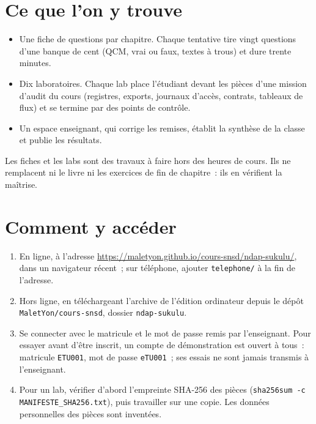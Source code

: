 \section*{Ce que l'on y trouve}

\begin{itemize}
    \item Une fiche de questions par chapitre. Chaque tentative tire vingt
          questions d'une banque de cent (QCM, vrai ou faux, textes à
          trous) et dure trente minutes.
    \item Dix laboratoires. Chaque lab place l'étudiant devant les pièces
          d'une mission d'audit du cours (registres, exports, journaux
          d'accès, contrats, tableaux de flux) et se termine par des points
          de contrôle.
    \item Un espace enseignant, qui corrige les remises, établit la
          synthèse de la classe et publie les résultats.
\end{itemize}

Les fiches et les labs sont des travaux à faire hors des heures de cours.
Ils ne remplacent ni le livre ni les exercices de fin de chapitre~: ils en
vérifient la maîtrise.

\section*{Comment y accéder}

\begin{enumerate}
    \item En ligne, à l'adresse
          \url{https://maletyon.github.io/cours-snsd/ndap-sukulu/}, dans un
          navigateur récent~; sur téléphone, ajouter \texttt{telephone/} à
          la fin de l'adresse.
    \item Hors ligne, en téléchargeant l'archive de l'édition ordinateur
          depuis le dépôt \texttt{MaletYon/cours-snsd}, dossier
          \texttt{ndap-sukulu}.
    \item Se connecter avec le matricule et le mot de passe remis par
          l'enseignant. Pour essayer avant d'être inscrit, un compte de
          démonstration est ouvert à tous~: matricule \texttt{ETU001}, mot
          de passe \texttt{eTU001}~; ses essais ne sont jamais transmis à
          l'enseignant.
    \item Pour un lab, vérifier d'abord l'empreinte SHA-256 des pièces
          (\texttt{sha256sum -c MANIFESTE\_SHA256.txt}), puis travailler sur
          une copie. Les données personnelles des pièces sont inventées.
\end{enumerate}


